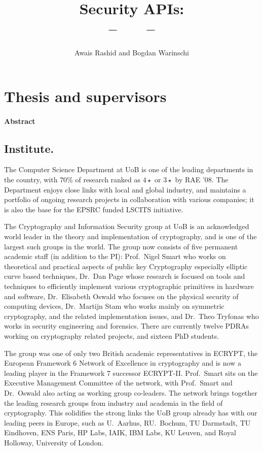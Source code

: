 \documentclass[10pt]{article}
\date{}
\title{\bf Security APIs:  \\
--{\large \ \ \ } --}
\author{Awais Rashid and Bogdan Warinschi}
\begin{document}
\maketitle
\section{Thesis and supervisors}


\paragraph*{Abstract}


\iffalse
\subsection*{Institute.}
The Computer Science Department at UoB is one of
the leading departments in the country, with $70$\% of research ranked as
$4\star$ or $3\star$ by RAE '08.
The Department enjoys close links with local and global industry, and maintains
a portfolio of ongoing research projects in collaboration with various
companies; it is also the base for the EPSRC funded LSCITS initiative.

The Cryptography and Information Security group at UoB is an acknowledged
world leader in the theory and implementation of cryptography, and is
one of the largest such groups in the world.
The group now consists of five permanent academic staff (in
addition to the PI): 
Prof.~Nigel Smart who works on theoretical and practical aspects of public key 
Cryptography especially elliptic curve based techniques, 
Dr.~Dan Page whose research is focused on tools and techniques to efficiently 
implement various cryptographic primitives in hardware and software, 
Dr.~Elisabeth Oswald who focuses on the physical security of computing devices, 
Dr.~Martijn Stam who works mainly on symmetric cryptography,  
and the related implementation issues, and 
Dr.~Theo Tryfonas who works in security engineering and forensics.
There are currently twelve PDRAs working on cryptography related projects, 
and sixteen PhD students.



The group was one of only two British academic representatives in ECRYPT, 
the European Framework 6 Network of Excellence in cryptography and is now a leading player in the Framework 7 successor  ECRYPT-II. 
Prof.~Smart sits on the Executive Management Committee of the network,
with Prof.~Smart and Dr.~Oswald also acting as working group co-leaders.
The network brings together the leading research groups from industry
and academia in the field of cryptography.
This solidifies the strong links the UoB group already has with our
leading peers in Europe, such as U.~Aarhus, RU.~Bochum, TU Darmstadt, TU Eindhoven, 
ENS Paris, HP Labs, IAIK, IBM Labs, KU Leuven, and Royal Holloway, University of London.
\end{document}
